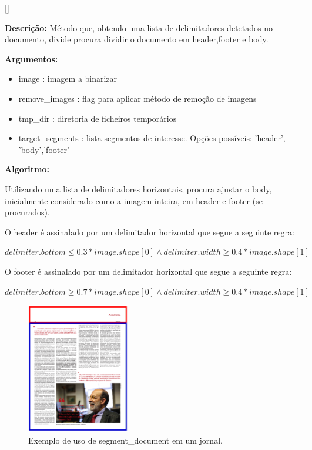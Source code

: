 [\normalsize]

\textbf{Descrição:} Método que, obtendo uma lista de delimitadores detetados no documento, divide procura dividir o documento em header,footer e body.


\textbf{Argumentos:}
\begin{itemize}\setlength\itemsep{-0.3em}
	\vspace{-0.5em}
	\item image : imagem a binarizar
	\item remove\_images : flag para aplicar método de remoção de imagens
	\item tmp\_dir : diretoria de ficheiros temporários
	\item target\_segments : lista segmentos de interesse. Opções possíveis: 'header', 'body','footer'
\end{itemize}

\textbf{Algoritmo:} 

Utilizando uma lista de delimitadores horizontais, procura ajustar o body, inicialmente considerado como a imagem inteira, em header e footer (se procurados). 

O header é assinalado por um delimitador horizontal que segue a seguinte regra:

$delimiter.bottom \leq 0.3*image.shape[0] \wedge delimiter.width \geq 0.4*image.shape[1]$

O footer é assinalado por um delimitador horizontal que segue a seguinte regra:

$delimiter.bottom \geq 0.7*image.shape[0] \wedge delimiter.width \geq 0.4*image.shape[1]$


\begin{figure}[H]
	\centering
	\includegraphics[width=0.4\textwidth]{images/ilustracoes/segment_document_example.png}
	\caption{Exemplo de uso de segment\_document em um jornal.}
	\label{fig:segment_document_example}
\end{figure}



